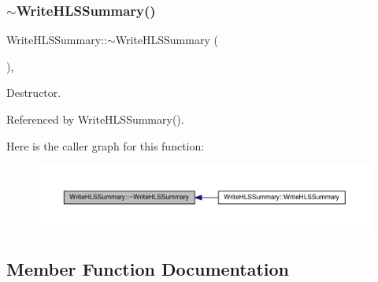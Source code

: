 \subsubsection{\texorpdfstring{$\sim$\+Write\+H\+L\+S\+Summary()}{~WriteHLSSummary()}}
{\footnotesize\ttfamily Write\+H\+L\+S\+Summary\+::$\sim$\+Write\+H\+L\+S\+Summary (\begin{DoxyParamCaption}{ }\end{DoxyParamCaption})\hspace{0.3cm}{\ttfamily [override]}, {\ttfamily [default]}}



Destructor. 



Referenced by Write\+H\+L\+S\+Summary().

Here is the caller graph for this function\+:
\nopagebreak
\begin{figure}[H]
\begin{center}
\leavevmode
\includegraphics[width=350pt]{d9/d1c/classWriteHLSSummary_ab8c4f4a9073b7911180943c29a217e79_icgraph}
\end{center}
\end{figure}


\subsection{Member Function Documentation}
\mbox{\label{classWriteHLSSummary_ab29ce95624208cd40c9cef9603c349bf}} 
